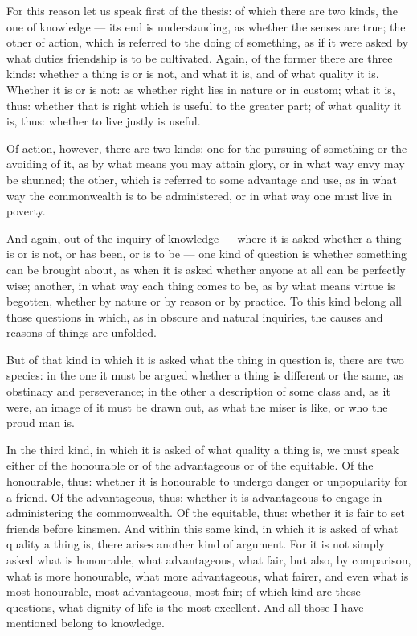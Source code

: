  For this reason let us speak first of the thesis: of which there are two kinds, the one of knowledge — its end is understanding, as whether the senses are true; the other of action, which is referred to the doing of something, as if it were asked by what duties friendship is to be cultivated. Again, of the former there are three kinds: whether a thing is or is not, and what it is, and of what quality it is. Whether it is or is not: as whether right lies in nature or in custom; what it is, thus: whether that is right which is useful to the greater part; of what quality it is, thus: whether to live justly is useful.

 Of action, however, there are two kinds: one for the pursuing of something or the avoiding of it, as by what means you may attain glory, or in what way envy may be shunned; the other, which is referred to some advantage and use, as in what way the commonwealth is to be administered, or in what way one must live in poverty.

 And again, out of the inquiry of knowledge — where it is asked whether a thing is or is not, or has been, or is to be — one kind of question is whether something can be brought about, as when it is asked whether anyone at all can be perfectly wise; another, in what way each thing comes to be, as by what means virtue is begotten, whether by nature or by reason or by practice. To this kind belong all those questions in which, as in obscure and natural inquiries, the causes and reasons of things are unfolded.

 But of that kind in which it is asked what the thing in question is, there are two species: in the one it must be argued whether a thing is different or the same, as obstinacy and perseverance; in the other a description of some class and, as it were, an image of it must be drawn out, as what the miser is like, or who the proud man is.

 In the third kind, in which it is asked of what quality a thing is, we must speak either of the honourable or of the advantageous or of the equitable. Of the honourable, thus: whether it is honourable to undergo danger or unpopularity for a friend. Of the advantageous, thus: whether it is advantageous to engage in administering the commonwealth. Of the equitable, thus: whether it is fair to set friends before kinsmen. And within this same kind, in which it is asked of what quality a thing is, there arises another kind of argument. For it is not simply asked what is honourable, what advantageous, what fair, but also, by comparison, what is more honourable, what more advantageous, what fairer, and even what is most honourable, most advantageous, most fair; of which kind are these questions, what dignity of life is the most excellent. And all those I have mentioned belong to knowledge.

